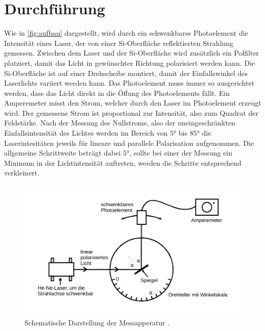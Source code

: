 \section{Durchführung}
\label{sec:Durchführung}

Wie in \autoref{fig:aufbau} dargestellt, wird durch ein schwenkbares Photoelement die Intensität eines Laser, der von einer Si-Oberfläche reflektierten Strahlung gemessen.
Zwischen dem Laser und der Si-Oberfläche wird zusätzlich ein Polfilter platziert, damit das Licht in gewünschter Richtung polarisiert werden kann.
Die Si-Oberfläche ist auf einer Drehscheibe montiert, damit der Einfallswinkel des Laserlichts variiert werden kann. 
Das Photoelement muss immer so ausgerichtet werden, dass das Licht direkt in die Öffung des Photoelements fällt.
Ein Amperemeter misst den Strom, welcher durch den Laser im Photoelement erzeugt wird. Der gemessene Strom ist proportional zur Intensität, also zum Quadrat der Feldstärke.
Nach der Messung des Nullstroms, also der uneingeschränkten Einfallsintensität des Lichtes werden im Bereich von $5°$ bis $85°$ die Laserintesitäten jeweils für lineare und parallele Polarisation aufgenommen.
Die allgemeine Schrittweite beträgt dabei $5°$, sollte bei einer der Messung ein Minimum in der Lichtintensität auftreten, werden die Schritte entsprechend verkleinert.

\begin{figure}[H]
    \centering
    \includegraphics{Aufbau.pdf}
    \caption{Schematische Darstellung der Messapperatur \cite{ap01}.}
    \label{fig:aufbau}
\end{figure}

